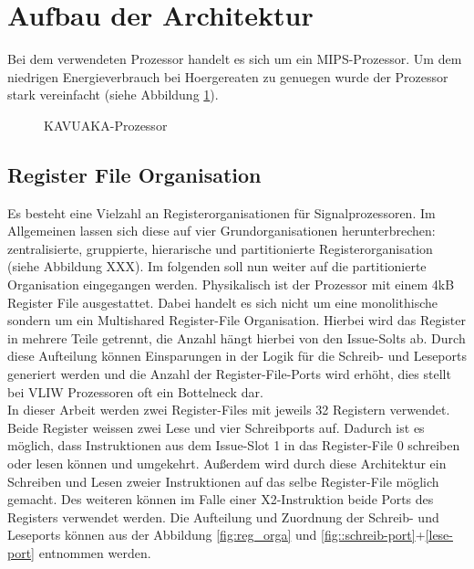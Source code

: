 \newpage

\section{Aufbau der Architektur}
\label{chap:architecture_overview}
Bei dem verwendeten Prozessor handelt es sich um ein MIPS-Prozessor.
Um dem niedrigen Energieverbrauch bei Hoergereaten zu genuegen wurde der Prozessor stark vereinfacht (siehe Abbildung \ref{fig:KAVUAKA}).


\begin{scriptsize}
	\begin{figure}[htbp] 
		\centering
		
		\caption{KAVUAKA-Prozessor}
		\label{fig:KAVUAKA}
	\end{figure}
\end{scriptsize}


\subsection{Register File Organisation}
Es besteht eine Vielzahl an Registerorganisationen für Signalprozessoren. Im Allgemeinen lassen sich diese auf vier Grundorganisationen herunterbrechen: zentralisierte, gruppierte, hierarische und partitionierte Registerorganisation (siehe Abbildung XXX).
Im folgenden soll nun weiter auf die partitionierte Organisation eingegangen werden. Physikalisch ist der Prozessor mit einem 4kB Register File ausgestattet. Dabei handelt es sich nicht um eine monolithische sondern um ein Multishared Register-File Organisation. Hierbei wird das Register in mehrere Teile getrennt, die Anzahl hängt hierbei von den Issue-Solts ab. Durch diese Aufteilung können Einsparungen in der Logik für die Schreib- und Leseports generiert werden und die Anzahl der Register-File-Ports wird erhöht, dies stellt bei VLIW Prozessoren oft ein Bottelneck dar.\\
In dieser Arbeit werden zwei Register-Files mit jeweils 32 Registern verwendet. Beide Register weissen zwei Lese und vier Schreibports auf. Dadurch ist es möglich, dass Instruktionen aus dem Issue-Slot 1 in das Register-File 0 schreiben oder lesen können und umgekehrt. Außerdem wird durch diese Architektur ein Schreiben und Lesen zweier Instruktionen auf das selbe Register-File möglich gemacht. Des weiteren können im Falle einer X2-Instruktion beide Ports des Registers verwendet werden. Die Aufteilung und  Zuordnung der Schreib- und Leseports können aus der Abbildung \ref{fig:reg_orga} und \autoref{fig::schreib-port}+\ref{lese-port} entnommen werden.

